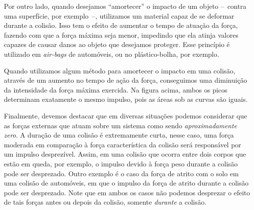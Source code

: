 Por outro lado, quando desejamos ``amortecer'' o impacto de um objeto --~contra uma superfície, por exemplo~--, utilizamos um material capaz de se deformar durante a colisão. Isso tem o efeito de aumentar o tempo de atuação da força, fazendo com que a força máxima seja menor, impedindo que ela atinja valores capazes de causar danos ao objeto que desejamos proteger. Esse princípio é utilizado em \emph{air-bags} de automóveis, ou no plástico-bolha, por exemplo.
\begin{marginfigure}
\centering
{}
\caption{Quando utilizamos algum método para amortecer o impacto em uma colisão, através de um aumento no tempo de ação da força, conseguimos uma diminuição da intensidade da força máxima exercida. Na figura acima, ambos os picos determinam exatamente o mesmo impulso, pois as áreas sob as curvas são iguais.\label{Fig:ForcaColisaoGaussianaAmortecida}}
\end{marginfigure}

Finalmente, devemos destacar que em diversas situações podemos considerar que as forças externas que atuam sobre um sistema como sendo \emph{aproximadamente zero}. A duração de uma colisão é extremamente curta, nesse caso, uma força moderada em comparação à força característica da colisão será responsável por um impulso desprezível. Assim, em uma colisão que ocorra entre dois corpos que estão em queda, por exemplo, o impulso devido à força peso durante a colisão pode ser desprezado. Outro exemplo é o caso da força de atrito com o solo em uma colisão de automóveis, em que o impulso da força de atrito durante a colisão pode ser desprezado. Note que em ambos os casos não podemos desprezar o efeito de tais forças antes ou depois da colisão, somente \emph{durante} a colisão.

